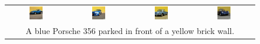 \begin{figure}[ht!]
\begin{tabular}{cccc}
        \includegraphics[width=0.24\textwidth]{figures/scaling_comparison/p356_0.jpg} &
        \includegraphics[width=0.24\textwidth]{figures/scaling_comparison/p356_1.jpg} &
        \includegraphics[width=0.24\textwidth]{figures/scaling_comparison/p356_2.jpg} &
        \includegraphics[width=0.24\textwidth]{figures/scaling_comparison/p356_3.jpg}\vspace{1mm} \\
        \multicolumn{4}{c}{\small A blue Porsche 356 parked in front of a yellow brick wall.}\vspace{3mm}\\


\end{tabular}
\end{figure}
